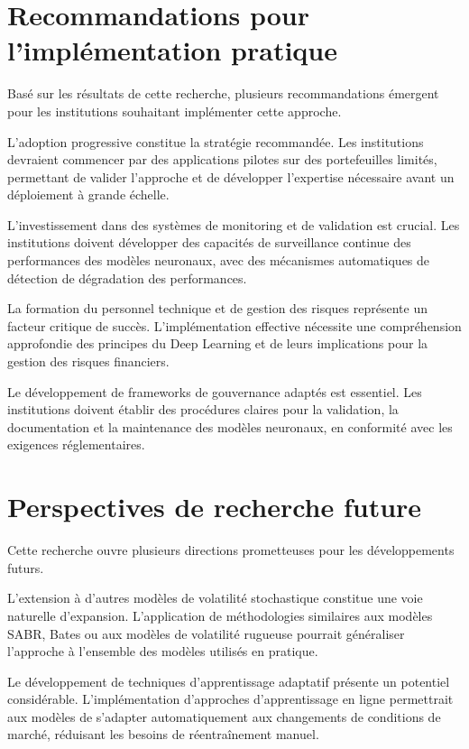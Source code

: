 \section{Recommandations pour l'implémentation pratique}

Basé sur les résultats de cette recherche, plusieurs recommandations émergent pour les institutions souhaitant implémenter cette approche.

L'adoption progressive constitue la stratégie recommandée. Les institutions devraient commencer par des applications pilotes sur des portefeuilles limités, permettant de valider l'approche et de développer l'expertise nécessaire avant un déploiement à grande échelle.

L'investissement dans des systèmes de monitoring et de validation est crucial. Les institutions doivent développer des capacités de surveillance continue des performances des modèles neuronaux, avec des mécanismes automatiques de détection de dégradation des performances.

La formation du personnel technique et de gestion des risques représente un facteur critique de succès. L'implémentation effective nécessite une compréhension approfondie des principes du Deep Learning et de leurs implications pour la gestion des risques financiers.

Le développement de frameworks de gouvernance adaptés est essentiel. Les institutions doivent établir des procédures claires pour la validation, la documentation et la maintenance des modèles neuronaux, en conformité avec les exigences réglementaires.

\section{Perspectives de recherche future}

Cette recherche ouvre plusieurs directions prometteuses pour les développements futurs.

L'extension à d'autres modèles de volatilité stochastique constitue une voie naturelle d'expansion. L'application de méthodologies similaires aux modèles SABR, Bates ou aux modèles de volatilité rugueuse pourrait généraliser l'approche à l'ensemble des modèles utilisés en pratique.

Le développement de techniques d'apprentissage adaptatif présente un potentiel considérable. L'implémentation d'approches d'apprentissage en ligne permettrait aux modèles de s'adapter automatiquement aux changements de conditions de marché, réduisant les besoins de réentraînement manuel.

